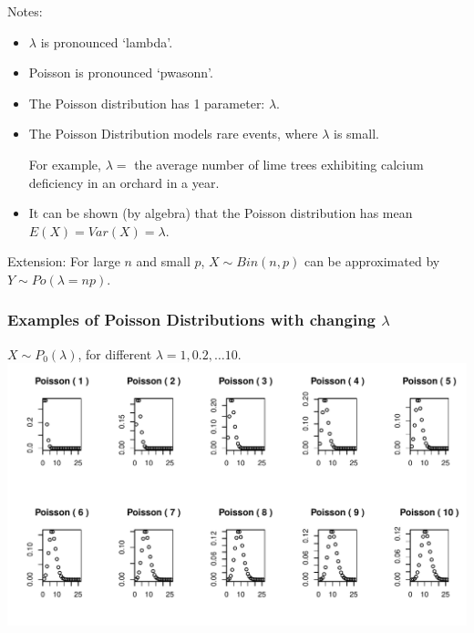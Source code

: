 \documentclass[t,xcolor=pdftex,dvipsnames,table]{beamer}
\makeatletter
\def\maxwidth{ %
  \ifdim\Gin@nat@width>\linewidth
    \linewidth
  \else
    \Gin@nat@width
  \fi
}
\newenvironment{knitrout}{}{} %
\makeatother
\begin{document}
\begin{frame}
Notes:
\begin{itemize}
\item $\lambda$ is pronounced `lambda'.
\item Poisson is pronounced `pwasonn'.
\item The Poisson distribution has 1 parameter: $\lambda$.
\item 
The Poisson Distribution models rare events, where $\lambda$ is small.

For example, $\lambda=$ the average number of lime trees exhibiting calcium deficiency in an orchard in a year.
\item It can be shown (by algebra) that the Poisson distribution has mean $E(X)=Var(X)=\lambda.$
\end{itemize}

\vspace{.5cm}
Extension: For large $n$ and small $p$, $X \sim Bin(n,p)$ can be approximated by $Y \sim Po(\lambda=np)$.
\end{frame}

\begin{frame}[fragile]\frametitle{Examples of Poisson Distributions with changing $\lambda$}

$X \sim P_{0}(\lambda)$, for different $\lambda=1,0.2,\ldots 10$. \\

\vspace{0.5cm}
\begin{knitrout}
\color{fgcolor}
\includegraphics[width=\maxwidth]{figure/unnamed-chunk-12-1} 

\end{knitrout}
\end{frame}
\end{document}
